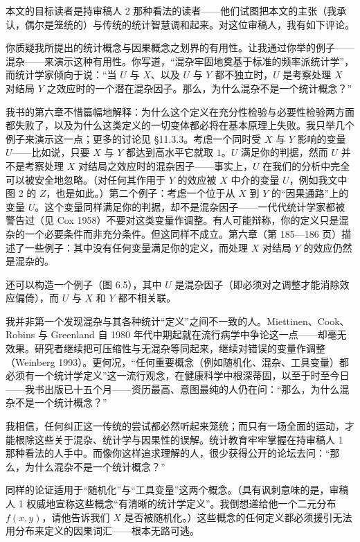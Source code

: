 本文的目标读者是持审稿人 2 那种看法的读者——他们试图把本文的主张（我承认，偶尔是笼统的）与传统的统计智慧调和起来。对这位审稿人，我有如下评论。

你质疑我所提出的统计概念与因果概念之划界的有用性。让我通过你举的例子——混杂——来演示这种有用性。你写道，“混杂牢固地奠基于标准的频率派统计学”，而统计学家倾向于说：“当 $U$ 与 $X$、以及 $U$ 与 $Y$ 都不独立时，$U$ 是考察处理 $X$ 对结局 $Y$ 之效应时的一个潜在混杂因子。那么，为什么混杂不是一个统计概念？”

我书的第六章不惜篇幅地解释：为什么这个定义在充分性检验与必要性检验两方面都失败了，以及为什么这类定义的一切变体都必将在基本原理上失败。我只举几个例子来演示这一点；更多的讨论见 \S11.3.3。考虑一个同时受 $X$ 与 $Y$ 影响的变量 $U$——比如说，只要 $X$ 与 $Y$ 都达到高水平它就取 $1$。$U$ 满足你的判据，然而 $U$ 并不是考察处理 $X$ 对结局之效应时的混杂因子——事实上，$U$ 在我们的分析中完全可以被安全地忽略。（对任何其作用于 $Y$ 的效应被 $X$ 中介的变量 $U$，例如我文中图 2 的 $Z$，也是如此。）第二个例子：考虑一个位于从 $X$ 到 $Y$ 的“因果通路”上的变量 $U$。这个变量同样满足你的判据，却不是混杂因子——一代代统计学家都被警告过（见 Cox 1958）不要对这类变量作调整。有人可能辩称，你的定义只是混杂的一个必要条件而非充分条件。但这同样不成立。第六章（第 185—186 页）描述了一些例子：其中没有任何变量满足你的定义，而处理 $X$ 对结局 $Y$ 的效应仍然是混杂的。

还可以构造一个例子（图 6.5），其中 $U$ 是混杂因子（即必须对之调整才能消除效应偏倚），而 $U$ 与 $X$ 和 $Y$ 都不相关联。

我并非第一个发现混杂与其各种统计“定义”之间不一致的人。Miettinen、Cook、Robins 与 Greenland 自 1980 年代中期起就在流行病学中争论这一点——却毫无效果。研究者继续把可压缩性与无混杂等同起来，继续对错误的变量作调整（Weinberg 1993）。更何况，“任何重要概念（例如随机化、混杂、工具变量）都必须有一个统计学定义”这一流行观念，在健康科学中根深蒂固，以至于时至今日——我书出版已十五个月——资历最高、意图最纯的人仍在问：“那么，为什么混杂不是一个统计概念？”

我相信，任何纠正这一传统的尝试都必然听起来笼统；而只有一场全面的运动，才能根除这些关于混杂、统计学与因果性的误解。统计教育牢牢掌握在持审稿人 1 那种看法的人手中。而像你这样追求理解的人，很少获得公开的论坛去问：“那么，为什么混杂不是一个统计概念？”

同样的论证适用于“随机化”与“工具变量”这两个概念。（具有讽刺意味的是，审稿人 1 权威地宣称这些概念“有清晰的统计学定义”。我倒想递给他一个二元分布 $f(x,y)$，请他告诉我们 $X$ 是否被随机化。）这些概念的任何定义都必须援引无法用分布来定义的因果词汇——根本无路可逃。

